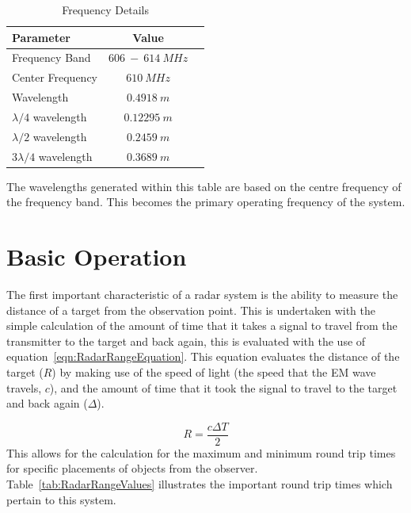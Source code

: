 \documentclass[11pt]{witseiepaper}
\begin{document}
\begin{table}
    \caption{Frequency Details}
    \label{tab:FrequencyDetails}
    \begin{center}
        \begin{tabular}{p{70mm}cp{70mm}}
            \hline 
            Parameter & Value \\
            \hline
            Frequency Band & $606~-~614~MHz$ \\
            Center Frequency & $610~MHz$ \\
            Wavelength & $0.4918~m$ \\
            $\lambda /4$ wavelength & $0.12295~m$ \\
            $\lambda /2$ wavelength & $0.2459~m$ \\
            $3 \lambda /4$ wavelength & $0.3689~m$ \\                
        \end{tabular}

    \end{center}
\end{table}
The wavelengths generated within this table are based on the centre frequency of the frequency band. This becomes the primary operating frequency of the system.



\section{Basic Operation} \label{sec:BasicOperation}
The first important characteristic of a radar system is the ability to measure the distance of a target from the observation point. This is undertaken with the simple calculation of the amount of time that it takes a signal to travel from the transmitter to the target and back again, this is evaluated with the use of equation~\ref{eqn:RadarRangeEquation}. This equation evaluates the distance of the target ($R$) by making use of the speed of light (the speed that the EM wave travels, $c$), and the amount of time that it took the signal to travel to the target and back again ($\Delta$).

\begin{equation} \label{eqn:RadarRangeEquation}
    R = \frac{c \Delta T}{2}
\end{equation}
This allows for the calculation for the maximum and minimum round trip times for specific placements of objects from the observer. Table~\ref{tab:RadarRangeValues} illustrates the important round trip times which pertain to this system.
\end{document}
